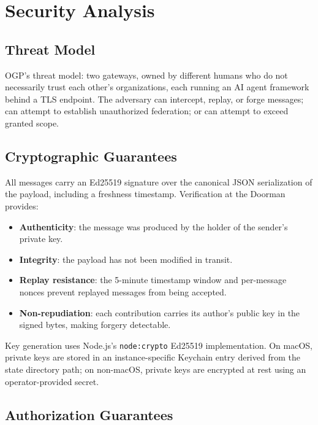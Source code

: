 \documentclass[sigconf,nonacm]{acmart}
\begin{document}
\section{Security Analysis}

\subsection{Threat Model}

OGP's threat model: two gateways, owned by different humans who do not
necessarily trust each other's organizations, each running an AI agent
framework behind a TLS endpoint. The adversary can intercept, replay,
or forge messages; can attempt to establish unauthorized federation;
or can attempt to exceed granted scope.

\subsection{Cryptographic Guarantees}

All messages carry an Ed25519 signature over the canonical JSON
serialization of the payload, including a freshness timestamp.
Verification at the Doorman provides:
\begin{itemize}
\item \textbf{Authenticity}: the message was produced by the holder of
  the sender's private key.
\item \textbf{Integrity}: the payload has not been modified in transit.
\item \textbf{Replay resistance}: the 5-minute timestamp window and
  per-message nonces prevent replayed messages from being accepted.
\item \textbf{Non-repudiation}: each contribution carries its author's
  public key in the signed bytes, making forgery detectable.
\end{itemize}

Key generation uses Node.js's \texttt{node:crypto} Ed25519 implementation.
On macOS, private keys are stored in an instance-specific Keychain entry
derived from the state directory path; on non-macOS, private keys are
encrypted at rest using an operator-provided secret.

\subsection{Authorization Guarantees}
\end{document}
